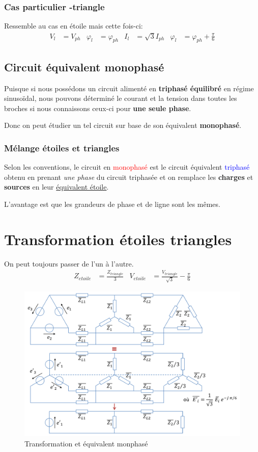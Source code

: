 \documentclass{report}
\begin{document}
\subsubsection{Cas particulier -triangle}
Ressemble au cas en étoile mais cette fois-ci:
\begin{align*}
V_l &= V_{ph} & \varphi_l &= \varphi_{ph}& I_l &= \sqrt{3} I_{ph} & \varphi_l &= \varphi_{ph} + \frac{\pi}{6}
\end{align*}


\subsection{Circuit équivalent monophasé}
Puisque si nous possédons un circuit alimenté en \textbf{triphasé équilibré} en régime sinusoïdal, nous pouvons déterminé le courant et la tension dans toutes les broches si nous connaissons ceux-ci pour \textbf{une seule phase}.\par
Donc on peut étudier un tel circuit sur base de son équivalent \textbf{monophasé}.

\subsubsection{Mélange étoiles et triangles}
Selon les conventions, le circuit en \textcolor{red}{monophasé} est le circuit équivalent \textcolor{blue}{triphasé} obtenu en prenant \textit{une phase} du circuit triphasée et on remplace les \textbf{charges} et \textbf{sources} en leur \underline{équivalent étoile}.\par
L'avantage est que les grandeurs de phase et de ligne sont les mêmes.

\section{Transformation étoiles triangles}
On peut toujours passer de l'un à l'autre.
\begin{align*}
Z_{etoile} &= \frac{Z_{triangle}}{3} & V_{etoile} &= \frac{V_{triangle}}{\sqrt{3}} - \frac{\pi}{6}
\end{align*}
\begin{figure}[H]
\centering
\includegraphics[width=12cm]{img/transfoEtoilesTriangles.png}
\caption{Transformation et équivalent monphasé}
\end{figure}
\end{document}
